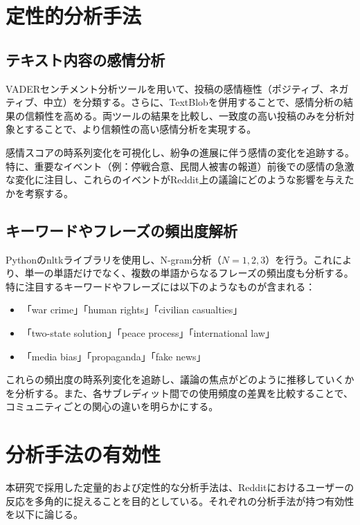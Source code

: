 \documentclass[11pt, a4j]{jreport}
\begin{document}
    \section{定性的分析手法}
    \subsection{テキスト内容の感情分析}
    VADERセンチメント分析ツールを用いて、投稿の感情極性（ポジティブ、ネガティブ、中立）を分類する。さらに、TextBlobを併用することで、感情分析の結果の信頼性を高める。両ツールの結果を比較し、一致度の高い投稿のみを分析対象とすることで、より信頼性の高い感情分析を実現する。

    感情スコアの時系列変化を可視化し、紛争の進展に伴う感情の変化を追跡する。特に、重要なイベント（例：停戦合意、民間人被害の報道）前後での感情の急激な変化に注目し、これらのイベントがReddit上の議論にどのような影響を与えたかを考察する。

    \subsection{キーワードやフレーズの頻出度解析}
    Pythonのnltkライブラリを使用し、N-gram分析（$N=1,2,3$）を行う。これにより、単一の単語だけでなく、複数の単語からなるフレーズの頻出度も分析する。特に注目するキーワードやフレーズには以下のようなものが含まれる：

    \begin{itemize}
        \item 「war crime」「human rights」「civilian casualties」

        \item 「two-state solution」「peace process」「international law」

        \item 「media bias」「propaganda」「fake news」
    \end{itemize}

    これらの頻出度の時系列変化を追跡し、議論の焦点がどのように推移していくかを分析する。また、各サブレディット間での使用頻度の差異を比較することで、コミュニティごとの関心の違いを明らかにする。

    \section{分析手法の有効性}
    本研究で採用した定量的および定性的な分析手法は、Redditにおけるユーザーの反応を多角的に捉えることを目的としている。それぞれの分析手法が持つ有効性を以下に論じる。
\end{document}
